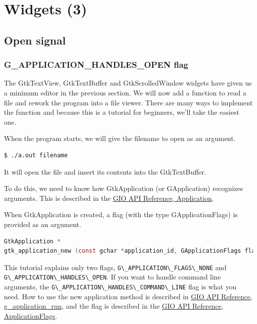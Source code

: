 \hypertarget{widgets-3}{%
\section{Widgets (3)}\label{widgets-3}}

\hypertarget{open-signal}{%
\subsection{Open signal}\label{open-signal}}

\hypertarget{g_application_handles_open-flag}{%
\subsubsection{G\_APPLICATION\_HANDLES\_OPEN
flag}\label{g_application_handles_open-flag}}

The GtkTextView, GtkTextBuffer and GtkScrolledWindow widgets have given
us a minimum editor in the previous section. We will now add a function
to read a file and rework the program into a file viewer. There are many
ways to implement the function and because this is a tutorial for
beginners, we'll take the easiest one.

When the program starts, we will give the filename to open as an
argument.

\begin{lstlisting}
$ ./a.out filename
\end{lstlisting}

It will open the file and insert its contents into the GtkTextBuffer.

To do this, we need to know how GtkApplication (or GApplication)
recognizes arguments. This is described in the
\href{https://docs.gtk.org/gio/class.Application.html}{GIO API
Reference, Application}.

When GtkApplication is created, a flag (with the type GApplicationFlags)
is provided as an argument.

\begin{lstlisting}[language=C]
GtkApplication *
gtk_application_new (const gchar *application_id, GApplicationFlags flags);
\end{lstlisting}

This tutorial explains only two flags,
\passthrough{\lstinline!G\_APPLICATION\_FLAGS\_NONE!} and
\passthrough{\lstinline!G\_APPLICATION\_HANDLES\_OPEN!}. If you want to
handle command line arguments, the
\passthrough{\lstinline!G\_APPLICATION\_HANDLES\_COMMAND\_LINE!} flag is
what you need. How to use the new application method is described in
\href{https://docs.gtk.org/gio/method.Application.run.html}{GIO API
Reference, g\_application\_run}, and the flag is described in the
\href{https://docs.gtk.org/gio/flags.ApplicationFlags.html}{GIO API
Reference, ApplicationFlags}.

